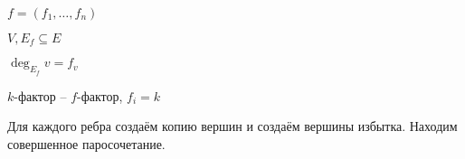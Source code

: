 \documentclass{book}
\theoremstyle{definition}
\newcommand{\incfig}[1]{%
    \def\svgwidth{\columnwidth}
    {#1.pdf_tex}
}
\begin{document}
\begin{definition}
    [$f$-фактор]
    $f = \left( f_1, \ldots, f_n \right) $

    $V, E_f\subseteq E$

    $\deg_{E_f}v = f_v$

    $k$-фактор --  $f$-фактор,  $f_i = k$
\end{definition}


Для каждого ребра создаём копию вершин и создаём вершины избытка. Находим совершенное паросочетание.
\end{document}
